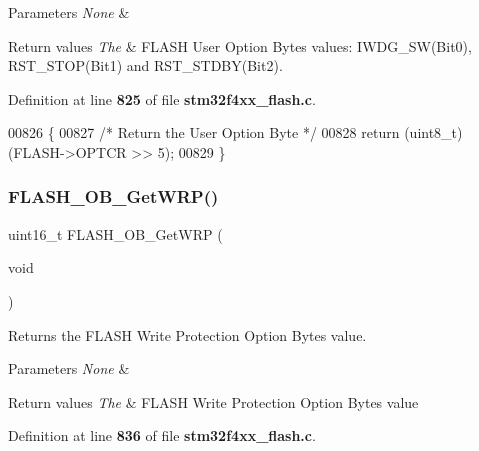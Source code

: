 \begin{DoxyParams}{Parameters}
{\em None} & \\
\hline
\end{DoxyParams}

\begin{DoxyRetVals}{Return values}
{\em The} & F\+L\+A\+SH User Option Bytes values\+: I\+W\+D\+G\+\_\+\+S\+W(\+Bit0), R\+S\+T\+\_\+\+S\+T\+O\+P(\+Bit1) and R\+S\+T\+\_\+\+S\+T\+D\+B\+Y(\+Bit2). \\
\hline
\end{DoxyRetVals}


Definition at line \textbf{ 825} of file \textbf{ stm32f4xx\+\_\+flash.\+c}.


\begin{DoxyCode}
00826 \{
00827   \textcolor{comment}{/* Return the User Option Byte */}
00828   \textcolor{keywordflow}{return} (uint8\_t)(FLASH->OPTCR >> 5);
00829 \}
\end{DoxyCode}
\mbox{\label{group__FLASH_gafa2aec5fa1ea7a73c31f3405f465c525}} 
\subsubsection{F\+L\+A\+S\+H\+\_\+\+O\+B\+\_\+\+Get\+W\+R\+P()}
{\footnotesize\ttfamily uint16\+\_\+t F\+L\+A\+S\+H\+\_\+\+O\+B\+\_\+\+Get\+W\+RP (\begin{DoxyParamCaption}\item[{void}]{ }\end{DoxyParamCaption})}



Returns the F\+L\+A\+SH Write Protection Option Bytes value. 


\begin{DoxyParams}{Parameters}
{\em None} & \\
\hline
\end{DoxyParams}

\begin{DoxyRetVals}{Return values}
{\em The} & F\+L\+A\+SH Write Protection Option Bytes value \\
\hline
\end{DoxyRetVals}


Definition at line \textbf{ 836} of file \textbf{ stm32f4xx\+\_\+flash.\+c}.


